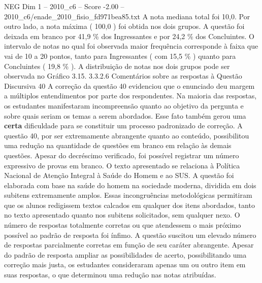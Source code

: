 \begin{textsample}{NEG Dim 1 – 2010\_c6 – Score -2.00 – 2010\_c6/enade\_2010\_fisio\_fd971bea85.txt}
A nota mediana total foi 10,0.
Por outro lado, a nota máxima ( 100,0 ) foi obtida nos dois grupos.
A questão foi deixada em branco por 41,9 \% dos Ingressantes e por 24,2 \% dos Concluintes.
O intervalo de notas no qual foi observada maior frequência corresponde à faixa que vai de 10 a 20 pontos, tanto para Ingressantes ( com 15,5 \% ) quanto para Concluintes ( 19,8 \% ).
A distribuição de notas nos dois grupos pode ser observada no Gráfico 3.15. 3.3.2.6 Comentários sobre as respostas à Questão Discursiva 40 A correção da questão 40 evidenciou que o enunciado deu margem a múltiplos entendimentos por parte dos respondentes.
Na maioria das respostas, os estudantes manifestaram incompreensão quanto ao objetivo da pergunta e sobre quais seriam os temas a serem abordados.
Esse fato também gerou uma \textbf{certa} dificuldade para se constituir um processo padronizado de correção.
A questão 40, por ser extremamente abrangente quanto ao conteúdo, possibilitou uma redução na quantidade de questões em branco em relação às demais questões.
Apesar do decréscimo verificado, foi possível registrar um número expressivo de provas em branco.
O texto apresentado se relaciona à Política Nacional de Atenção Integral à Saúde do Homem e ao SUS.
A questão foi elaborada com base na saúde do homem na sociedade moderna, dividida em dois subitens extremamente amplos.
Essas incongruências metodológicas permitiram que os alunos redigissem textos calcados em qualquer dos itens abordados, tanto no texto apresentado quanto nos subitens solicitados, sem qualquer nexo.
O número de respostas totalmente corretas ou que atendessem o mais próximo possível ao padrão de resposta foi ínfimo.
A questão suscitou um elevado número de respostas parcialmente corretas em função de seu caráter abrangente.
Apesar do padrão de resposta ampliar as possibilidades de acerto, possibilitando uma correção mais justa, os estudantes consideraram apenas um ou outro item em suas respostas, o que determinou uma redução nas notas atribuídas.

\end{textsample}
